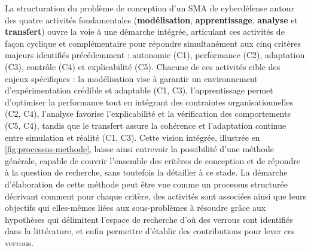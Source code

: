 La structuration du problème de conception d'un SMA de cyberdéfense autour des quatre activités fondamentales (\textbf{modélisation}, \textbf{apprentissage}, \textbf{analyse} et \textbf{transfert}) ouvre la voie à une démarche intégrée, articulant ces activités de façon cyclique et complémentaire pour répondre simultanément aux cinq critères majeurs identifiés précédemment : autonomie (C1), performance (C2), adaptation (C3), contrôle (C4) et explicabilité (C5). Chacune de ces activités cible des enjeux spécifiques : la modélisation vise à garantir un environnement d'expérimentation crédible et adaptable (C1, C3), l'apprentissage permet d'optimiser la performance tout en intégrant des contraintes organisationnelles (C2, C4), l'analyse favorise l'explicabilité et la vérification des comportements (C5, C4), tandis que le transfert assure la cohérence et l'adaptation continue entre simulation et réalité (C1, C3).
%
Cette vision intégrée, illustrée en \autoref{fig:processus-methode}, laisse ainsi entrevoir la possibilité d'une méthode générale, capable de couvrir l'ensemble des critères de conception et de répondre à la question de recherche, sans toutefois la détailler à ce stade. La démarche d'élaboration de cette méthode peut être vue comme un processus structurée décrivant comment pour chaque critère, des activités sont associées ainsi que leurs objectifs qui elles-mêmes liées aux sous-problèmes à résoudre grâce aux hypothèses qui délimitent l'espace de recherche d'où des verrous sont identifiés dans la littérature, et enfin permettre d'établir des contributions pour lever ces verrous.

